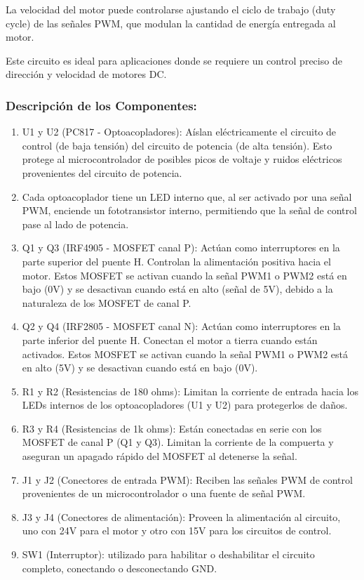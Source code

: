\documentclass{article}
\begin{document}
La velocidad del motor puede controlarse ajustando el ciclo de trabajo (duty cycle) de las señales PWM, que modulan la cantidad de energía entregada al motor.

Este circuito es ideal para aplicaciones donde se requiere un control preciso de dirección y velocidad de motores DC.

\subsubsection{Descripción de los Componentes:}

\begin{enumerate}
    \item U1 y U2 (PC817 - Optoacopladores): Aíslan eléctricamente el circuito de control (de baja tensión) del circuito de potencia (de alta tensión). Esto protege al microcontrolador de posibles picos de voltaje y ruidos eléctricos provenientes del circuito de potencia.
    \item Cada optoacoplador tiene un LED interno que, al ser activado por una señal PWM, enciende un fototransistor interno, permitiendo que la señal de control pase al lado de potencia.
    \item Q1 y Q3 (IRF4905 - MOSFET canal P): Actúan como interruptores en la parte superior del puente H. Controlan la alimentación positiva hacia el motor. Estos MOSFET se activan cuando la señal PWM1 o PWM2 está en bajo (0V) y se desactivan cuando está en alto (señal de 5V), debido a la naturaleza de los MOSFET de canal P.
    \item Q2 y Q4 (IRF2805 - MOSFET canal N): Actúan como interruptores en la parte inferior del puente H. Conectan el motor a tierra cuando están activados. Estos MOSFET se activan cuando la señal PWM1 o PWM2 está en alto (5V) y se desactivan cuando está en bajo (0V).
    \item R1 y R2 (Resistencias de 180 ohms): Limitan la corriente de entrada hacia los LEDs internos de los optoacopladores (U1 y U2) para protegerlos de daños.
    \item R3 y R4 (Resistencias de 1k ohms): Están conectadas en serie con los MOSFET de canal P (Q1 y Q3). Limitan la corriente de la compuerta y aseguran un apagado rápido del MOSFET al detenerse la señal.
    \item J1 y J2 (Conectores de entrada PWM): Reciben las señales PWM de control provenientes de un microcontrolador o una fuente de señal PWM.
    \item J3 y J4 (Conectores de alimentación): Proveen la alimentación al circuito, uno con 24V para el motor y otro con 15V para los circuitos de control.
    \item SW1 (Interruptor):  utilizado para habilitar o deshabilitar el circuito completo, conectando o desconectando GND.
\end{enumerate}
\end{document}
